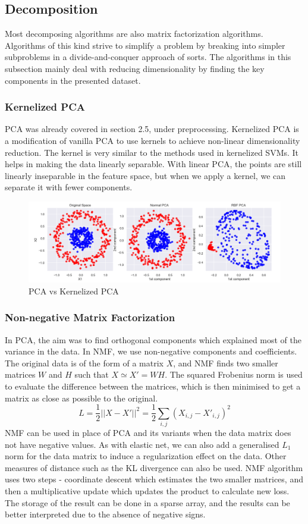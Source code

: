 \documentclass{article}
\begin{document}
\subsection{Decomposition}
Most decomposing algorithms are also matrix factorization algorithms. Algorithms of this kind strive to simplify a problem by breaking into simpler subproblems in a divide-and-conquer approach of sorts. The algorithms in this subsection mainly deal with reducing dimensionality by finding the key components in the presented dataset.

\subsubsection{Kernelized PCA}
PCA was already covered in section 2.5, under preprocessing. Kernelized PCA is a modification of vanilla PCA to use kernels to achieve non-linear dimensionality reduction. The kernel is very similar to the methods used in kernelized SVMs. It helps in making the data linearly separable. With linear PCA, the points are still linearly inseparable in the feature space, but when we apply a kernel, we can separate it with fewer components. 

\begin{figure}[H]
\includegraphics[width=0.9\linewidth]{Images/kernel_pca.png}
\centering
\caption{PCA vs Kernelized PCA}
\end{figure}

\subsubsection{Non-negative Matrix Factorization}
In PCA, the aim was to find orthogonal components which explained most of the variance in the data. In NMF, we use non-negative components and coefficients. The original data is of the form of a matrix $X$, and NMF finds two smaller matrices $W$ and $H$ such that $X \simeq X' = WH$. The squared Frobenius norm is used to evaluate the difference between the matrices, which is then minimised to get a matrix as close as possible to the original.
$$L = \frac{1}{2} ||X-X'||^2 = \frac{1}{2} \sum_{i, j} (X_{i, j} - X'_{i, j})^2$$
NMF can be used in place of PCA and its variants when the data matrix does not have negative values. As with elastic net, we can also add a generalised $L_1$ norm for the data matrix to induce a regularization effect on the data. Other measures of distance such as the KL divergence can also be used. NMF algorithm uses two steps - coordinate descent which estimates the two smaller matrices, and then a multiplicative update which updates the product to calculate new loss. The storage of the result can be done in a sparse array, and the results can be better interpreted due to the absence of negative signs.
\end{document}
